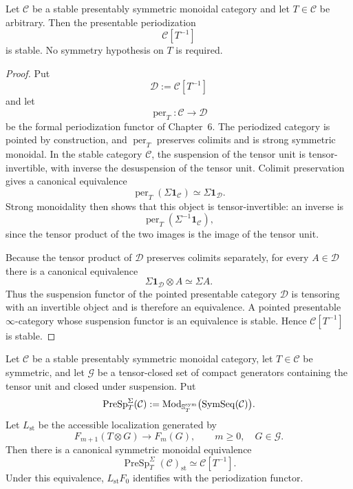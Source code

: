 \begin{lemma}
\label{lem:infinitesimal-stable-periodization}
Let $\mathcal C$ be a stable presentably symmetric monoidal category and let
$T\in\mathcal C$ be arbitrary.  Then the presentable periodization
\[
    \mathcal C[T^{-1}]
\]
is stable.  No symmetry hypothesis on $T$ is required.
\end{lemma}

\begin{proof}
Put
\[
    \mathcal D:=\mathcal C[T^{-1}]
\]
and let
\[
    \operatorname{per}_T:\mathcal C\longrightarrow\mathcal D
\]
be the formal periodization functor of Chapter~6.  The periodized category is
pointed by construction, and $\operatorname{per}_T$ preserves colimits and is
strong symmetric monoidal.  In the stable category $\mathcal C$, the
suspension of the tensor unit is tensor-invertible, with inverse the
desuspension of the tensor unit.  Colimit preservation gives a canonical equivalence
\[
    \operatorname{per}_T(\Sigma\mathbf1_{\mathcal C})
    \simeq
    \Sigma\mathbf1_{\mathcal D}.
\]
Strong monoidality then shows that this object is tensor-invertible: an inverse
is
\[
    \operatorname{per}_T(\Sigma^{-1}\mathbf1_{\mathcal C}),
\]
since the tensor product of the two images is the image of the tensor unit.

Because the tensor product of $\mathcal D$ preserves colimits separately, for
every $A\in\mathcal D$ there is a canonical equivalence
\[
    \Sigma\mathbf1_{\mathcal D}\otimes A
    \simeq
    \Sigma A.
\]
Thus the suspension functor of the pointed presentable category $\mathcal D$
is tensoring with an invertible object and is therefore an equivalence.
A pointed presentable $\infty$-category whose suspension functor is an
equivalence is stable.  Hence $\mathcal C[T^{-1}]$ is stable.
\end{proof}

\begin{lemma}
\label{lem:infinitesimal-symmetric-periodization}
Let $\mathcal C$ be a stable presentably symmetric monoidal category, let
$T\in\mathcal C$ be symmetric, and let $\mathcal G$ be a tensor-closed set of
compact generators containing the tensor unit and closed under suspension.
Put
\[
    \operatorname{PreSp}^{\Sigma}_T(\mathcal C)
    :=
    \operatorname{Mod}_{\mathbb S_T^{\mathrm{sym}}}
    \bigl(\operatorname{SymSeq}(\mathcal C)\bigr).
\]
Let $L_{\mathrm{st}}$ be the accessible localization generated by
\[
    F_{m+1}(T\otimes G)\longrightarrow F_m(G),
    \qquad
    m\geq0,
    \quad
    G\in\mathcal G.
\]
Then there is a canonical symmetric monoidal equivalence
\[
    \boxed{
    \operatorname{PreSp}^{\Sigma}_T(\mathcal C)_{\mathrm{st}}
    \simeq
    \mathcal C[T^{-1}].
    }
\]
Under this equivalence, $L_{\mathrm{st}}F_0$ identifies with the
periodization functor.
\end{lemma}

